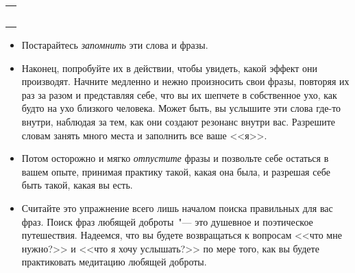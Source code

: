 \setlength{\extrarowheight}{2mm}
\begin{tabularx}{\textwidth}{X}
	\\
	\arrayrulecolor{gray}\hline\\
	\hline\\
	\hline\\
	\hline\\
	\hline\\
	\hline\\
\end{tabularx}
\setlength{\extrarowheight}{0mm}

\begin{itemize}
	\item Постарайтесь \emph{запомнить} эти слова и фразы.
	
	\item Наконец, попробуйте их в действии, чтобы увидеть, какой эффект они производят. Начните медленно и нежно произносить свои фразы, повторяя их раз за разом и представляя себе, что вы их шепчете в собственное ухо, как будто на ухо близкого человека. Может быть, вы услышите эти слова где-то внутри, наблюдая за тем, как они создают резонанс внутри вас. Разрешите словам занять много места и заполнить все ваше <<я>>.
	
	\item Потом осторожно и мягко \emph{отпустите} фразы и позвольте себе остаться в вашем опыте, принимая практику такой, какая она была, и разрешая себе быть такой, какая вы есть.
	
	\item Считайте это упражнение всего лишь началом поиска правильных для вас фраз. Поиск фраз любящей доброты~"--- это душевное и поэтическое путешествия. Надеемся, что вы будете возвращаться к вопросам <<что мне нужно?>> и <<что я хочу услышать?>> по мере того, как вы будете практиковать медитацию любящей доброты.
\end{itemize}


\newpage
{} \label{M:Loving-Kindness_for_Ourselves}

